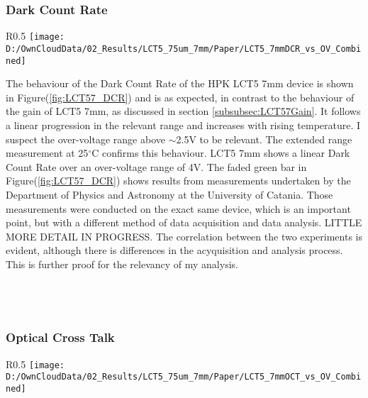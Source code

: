 \documentclass[12pt,article,type=msc,colorback,accentcolor=tud9c]{tudthesis}
\begin{document}
\subsubsection{Dark Count Rate}
\label{subsubsec:LCT57DCR}
\begin{wrapfigure}{R}{0.5\textwidth}
\centering
\texttt{[image: D:/OwnCloudData/02\_Results/LCT5\_75um\_7mm/Paper/LCT5\_7mmDCR\_vs\_OV\_Combined]}
\caption{\label{fig:LCT57_DCR}Dark Count Rate of the HPK LCT5 7mm pixel}
\end{wrapfigure}


The behaviour of the Dark Count Rate of the HPK LCT5 7mm device is shown in Figure(\ref{fig:LCT57_DCR}) and is as expected, in contrast to the behaviour of the gain of LCT5 7mm, as discussed in section \ref{subsubsec:LCT57Gain}. It follows a linear progression in the relevant range and increases with rising temperature. I suspect the over-voltage range above $\sim$2.5V to be relevant. The extended range measurement at 25$^\circ$C confirms this behaviour. LCT5 7mm shows a linear Dark Count Rate over an over-voltage range of 4V. The faded green bar in Figure(\ref{fig:LCT57_DCR}) shows results from measurements undertaken by the Department of Physics and Astronomy at the University of Catania. Those measurements were conducted on the exact same device, which is an important point, but with a different method of data acquisition and data analysis. LITTLE MORE DETAIL IN PROGRESS. The correlation between the two experiments is evident, although there is differences in the acyquisition and analysis process. This is further proof for the relevancy of my analysis. 
\\\\\\\\

\newpage
\subsubsection{Optical Cross Talk}
\begin{wrapfigure}{R}{0.5\textwidth}
\centering
\texttt{[image: D:/OwnCloudData/02\_Results/LCT5\_75um\_7mm/Paper/LCT5\_7mmOCT\_vs\_OV\_Combined]}
\caption{\label{fig:LCT57_OCT}Dark Count Rate of the HPK LCT5 7mm pixel}
\end{wrapfigure}
\end{document}
